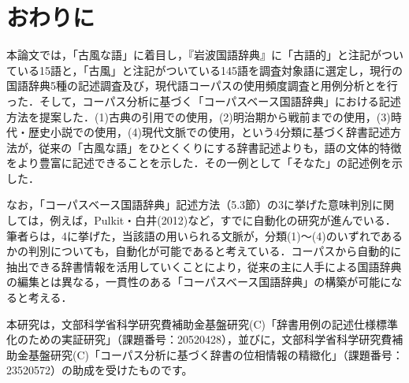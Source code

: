 \documentclass[japanese]{jnlp_1.4}
\begin{document}
\section{おわりに}

本論文では，「古風な語」に着目し，『岩波国語辞典』に「古語的」と注記がついている15語と，「古風」と注記がついている145語を調査対象語に選定し，現行の国語辞典5種の記述調査及び，現代語コーパスの使用頻度調査と用例分析とを行った．そして，コーパス分析に基づく「コーパスベース国語辞典」における記述方法を提案した．(1)古典の引用での使用，(2)明治期から戦前までの使用，(3)時代・歴史小説での使用，(4)現代文脈での使用，という4分類に基づく辞書記述方法が，従来の「古風な語」をひとくくりにする辞書記述よりも，語の文体的特徴をより豊富に記述できることを示した．その一例として「そなた」の記述例を示した．

なお，「コーパスベース国語辞典」記述方法（5.3節）の3に挙げた意味判別に関しては，例えば，Pulkit・白井(2012)など，すでに自動化の研究が進んでいる．筆者らは，4に挙げた，当該語の用いられる文脈が，分類(1)〜(4)のいずれであるかの判別についても，自動化が可能であると考えている．コーパスから自動的に抽出できる辞書情報を活用していくことにより，従来の主に人手による国語辞典の編集とは異なる，一貫性のある「コーパスベース国語辞典」の構築が可能になると考える．


\acknowledgment

本研究は，文部科学省科学研究費補助金基盤研究(C)「辞書用例の記述仕様標準化のための実証研究」（課題番号：20520428），並びに，文部科学省科学研究費補助金基盤研究(C)「コーパス分析に基づく辞書の位相情報の精緻化」（課題番号：23520572）の助成を受けたものです。



\end{document}
